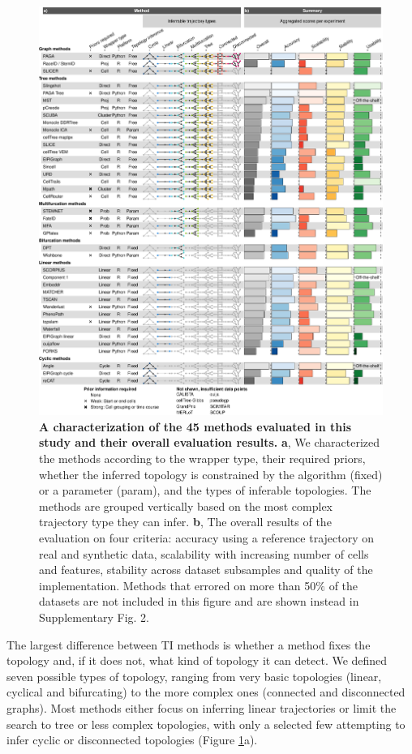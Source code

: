 \begin{figure}[htb!]
	\centering\includegraphics[width=\linewidth]{fig/figure_2.pdf}
	\caption{
		\textbf{A characterization of the 45 methods evaluated in this study and their overall evaluation results.}
		\textbf{a}, We characterized the methods according to the wrapper type, their required priors, whether the inferred topology is constrained by the algorithm (fixed) or a parameter (param), and the types of inferable topologies. The methods are grouped vertically based on the most complex trajectory type they can infer. \textbf{b}, The overall results of the evaluation on four criteria: accuracy using a reference trajectory on real and synthetic data, scalability with increasing number of cells and features, stability across dataset subsamples and quality of the implementation. Methods that errored on more than 50$\%$ of the datasets are not included in this figure and are shown instead in Supplementary Fig. 2.
	}
	\label{fig:figure_2}
\end{figure}

The largest difference between TI methods is whether a method fixes the topology and, if it does not, what kind of topology it can detect. We defined seven possible types of topology, ranging from very basic topologies (linear, cyclical and bifurcating) to the more complex ones (connected and disconnected graphs). Most methods either focus on inferring linear trajectories or limit the search to tree or less complex topologies, with only a selected few attempting to infer cyclic or disconnected topologies (Figure \ref{fig:figure_2}a).

